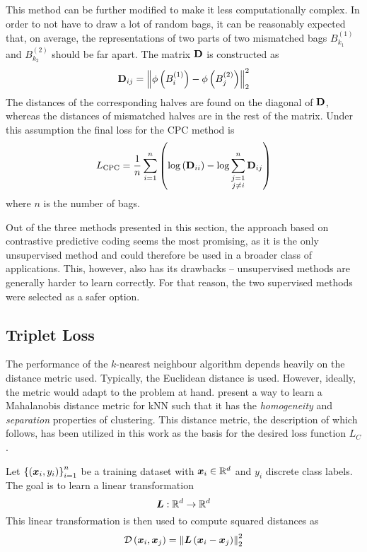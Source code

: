 This method can be further modified to make it less computationally complex. In order to not have to draw a lot of random bags, it can be reasonably expected that, on average, the representations of two parts of two mismatched bags \( B_{k_1}^{(1)} \) and \( B_{k_2}^{(2)} \) should be far apart. The matrix \( \mathbf{D} \) is constructed as
\begin{equation}\label{eq:bag-distance-matrix}
	\mathbf{D}_{ij} = \left\lVert \phi \left( B_i^{(1)} \right) - \phi \left( B_j^{(2)} \right) \right\rVert_2^2
\end{equation}
The distances of the corresponding halves are found on the diagonal of \( \mathbf{D} \), whereas the distances of mismatched halves are in the rest of the matrix. Under this assumption the final loss for the CPC method is
\[ L_\mathrm{CPC} = \frac{1}{n} \sum_{i = 1}^n \left( \log \left( \mathbf{D}_{ii} \right) - \log \sum_{\substack{j = 1 \\ j \neq i}}^n \mathbf{D}_{ij} \right) \]
where \( n \) is the number of bags.

Out of the three methods presented in this section, the approach based on contrastive predictive coding seems the most promising, as it is the only unsupervised method and could therefore be used in a broader class of applications. This, however, also has its drawbacks -- unsupervised methods are generally harder to learn correctly. For that reason, the two supervised methods were selected as a safer option.

\subsection{Triplet Loss}
The performance of the \( k \)-nearest neighbour algorithm depends heavily on the distance metric used. Typically, the Euclidean distance is used. However, ideally, the metric would adapt to the problem at hand. \cite{weinberger_distance_2006} present a way to learn a Mahalanobis distance metric for kNN such that it has the \textit{homogeneity} and \textit{separation} properties of clustering. This distance metric, the description of which follows, has been utilized in this work as the basis for the desired loss function \( L_C \).

Let \( \left\{ \left( \bm{x}_i, y_i \right) \right\}_{i = 1}^n \) be a training dataset with \( \bm{x}_i \in \mathbb{R}^d \) and \( y_i \) discrete class labels. The goal is to learn a linear transformation
\[ \bm{L} : \mathbb{R}^d \to \mathbb{R}^d \]
This linear transformation is then used to compute squared distances as
\[ \mathcal{D} \left( \bm{x}_i, \bm{x}_j \right) = \left\lVert \bm{L} \left( \bm{x}_i - \bm{x}_j \right) \right\rVert_2^2 \]

